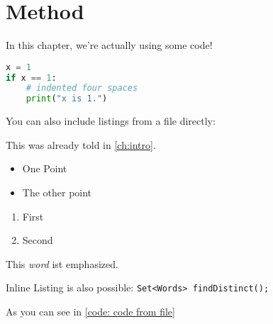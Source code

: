 \chapter{Method}\label{ch:method}

In this chapter, we're actually using some code!

\begin{lstlisting}[language=Python,caption={This is an example of a listing with code in tex},captionpos=b,label=code: code in tex]
x = 1
if x == 1:
    # indented four spaces
    print("x is 1.")

\end{lstlisting}

You can also include listings from a file directly:



This was already told in \autoref{ch:intro}.

\begin{itemize}
	\item One Point
	\item The other point
\end{itemize}

\begin{enumerate}
	\item First
	\item Second
\end{enumerate}

This \emph{word} ist emphasized.
\par
Inline Listing is also possible: \lstinline|Set<Words> findDistinct();|
\par
As you can see in \autoref{code: code from file}